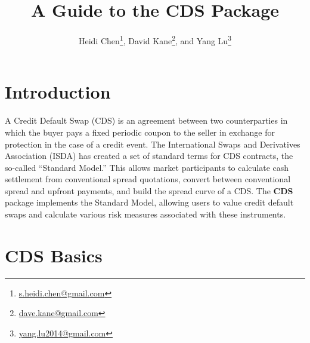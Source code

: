 \documentclass[a4paper]{article}
\begin{document}

\title{A Guide to the CDS Package}
\author{Heidi Chen\thanks{\href{mailto:s.heidi.chen@gmail.com}{s.heidi.chen@gmail.com}}, David Kane\thanks{\href{mailto:dave.kane@gmail.com}{dave.kane@gmail.com}}, and Yang Lu\thanks{\href{mailto:yang.lu2014@gmail.com}{yang.lu2014@gmail.com}}}
\maketitle




\section{Introduction}


A Credit Default Swap (CDS) is an agreement between two
counterparties in which the buyer pays a fixed periodic coupon to the
seller in exchange for protection in the case of a credit event. The
International Swaps and Derivatives Association (ISDA) has created a
set of standard terms for CDS contracts, the so-called ``Standard
Model.'' This allows market participants to calculate cash settlement
from conventional spread quotations, convert between conventional
spread and upfront payments, and build the spread curve of a CDS. The
\textbf{CDS} package implements the Standard Model, allowing users to
value credit default swaps and calculate various risk measures
associated with these instruments.



\section{CDS Basics}
\label{sec:CDSBasics}
\end{document}
